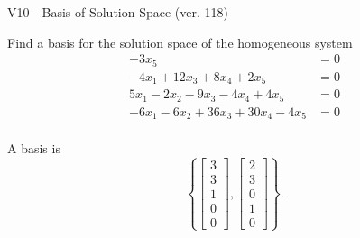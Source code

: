 \begin{exercise}
  \begin{exerciseTitle}V10 - Basis of Solution Space (ver. 118)\end{exerciseTitle}
  \begin{exerciseStatement}
    Find a basis for the solution space of the homogeneous system 
\begin{align*}
 + 3 x_ 5 &= 0  \\ 
  -4 x_ 1 + 12 x_ 3 + 8 x_ 4 + 2 x_ 5 &= 0  \\ 
  5 x_ 1 -2 x_ 2 -9 x_ 3 -4 x_ 4 + 4 x_ 5 &= 0  \\ 
  -6 x_ 1 -6 x_ 2 + 36 x_ 3 + 30 x_ 4 -4 x_ 5 &= 0  \\ 
 \end{align*}


 
  \end{exerciseStatement}

  \begin{exerciseAnswer}
   A basis is   
\[\left\{\left[\begin{array}{c}
3 \\
3 \\
1 \\
0 \\
0
\end{array}\right] , \left[\begin{array}{c}
2 \\
3 \\
0 \\
1 \\
0
\end{array}\right]\right\}.\]

  


  \end{exerciseAnswer}
\end{exercise}